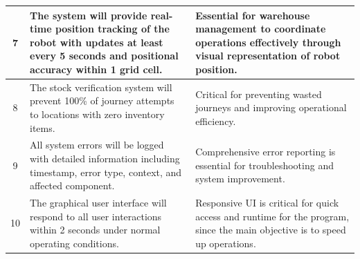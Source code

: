 \begin{table}[htbp!]
\begin{tabularx}{\textwidth}{|c|X|X|}
\hline
7 & The system will provide real-time position tracking of the robot with updates at least every 5 seconds and positional accuracy within 1 grid cell. & Essential for warehouse management to coordinate operations effectively through visual representation of robot position. \\
\hline
8 & The stock verification system will prevent 100\% of journey attempts to locations with zero inventory items. & Critical for preventing wasted journeys and improving operational efficiency. \\
\hline
9 & All system errors will be logged with detailed information including timestamp, error type, context, and affected component. & Comprehensive error reporting is essential for troubleshooting and system improvement. \\
\hline
10 & The graphical user interface will respond to all user interactions within 2 seconds under normal operating conditions. & Responsive UI is critical for quick access and runtime for the program, since the main objective is to speed up operations. \\
\hline
\end{tabularx}
\end{table}
\newpage
